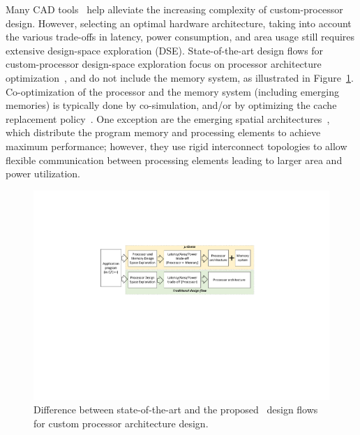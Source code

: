 Many CAD tools~\cite{synopsystool,tensilica,codasiptool} help alleviate the increasing complexity of custom-processor design. However, selecting an optimal hardware architecture, taking into account the various trade-offs in latency, power consumption, and area usage still requires extensive design-space exploration (DSE). 
State-of-the-art design flows for custom-processor design-space exploration focus on processor architecture optimization~\cite{Meloni2012,EusseSAMOS2014,Jozwiak2013,Karuri2009}, and do not include the memory system, as illustrated in Figure~\ref{fig:intro}. Co-optimization of the processor and the memory system (including emerging memories) is typically done by co-simulation, and/or by optimizing the cache replacement policy~\cite{4798259,7092595,6271803,Mittal13f}. 
One exception are the emerging spatial architectures~\cite{7284058,8686088}, which distribute the program memory and processing elements to achieve maximum performance; however, they use rigid interconnect topologies to allow flexible communication between processing elements leading to larger area and power utilization.

\begin{figure}[ht]
    \centering
    \includegraphics[clip, trim=6cm 10.5cm 6.4cm 5.2cm, width=1.0\linewidth]{images/intro_figure.pdf} %
    \caption{\small Difference between state-of-the-art and the proposed \frameworkname~design flows for custom processor architecture design.}
    \label{fig:intro}
\end{figure}

